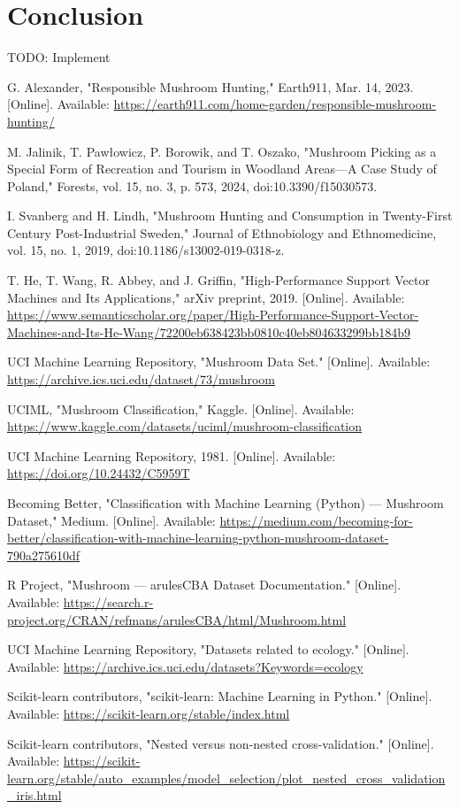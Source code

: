\documentclass[conference]{IEEEtran}
\begin{document}
\section{Conclusion}
TODO: Implement

\begin{thebibliography}{9}
 G. Alexander, "Responsible Mushroom Hunting," Earth911, Mar. 14, 2023. [Online]. Available: \url{https://earth911.com/home-garden/responsible-mushroom-hunting/}

 M. Jalinik, T. Paw\l{}owicz, P. Borowik, and T. Oszako, "Mushroom Picking as a Special Form of Recreation and Tourism in Woodland Areas—A Case Study of Poland," Forests, vol. 15, no. 3, p. 573, 2024, doi:10.3390/f15030573.

 I. Svanberg and H. Lindh, "Mushroom Hunting and Consumption in Twenty-First Century Post-Industrial Sweden," Journal of Ethnobiology and Ethnomedicine, vol. 15, no. 1, 2019, doi:10.1186/s13002-019-0318-z.

 T. He, T. Wang, R. Abbey, and J. Griffin, "High-Performance Support Vector Machines and Its Applications," arXiv preprint, 2019. [Online]. Available: \url{https://www.semanticscholar.org/paper/High-Performance-Support-Vector-Machines-and-Its-He-Wang/72200eb638423bb0810c40eb804633299bb184b9}

 UCI Machine Learning Repository, "Mushroom Data Set." [Online]. Available: \url{https://archive.ics.uci.edu/dataset/73/mushroom}

 UCIML, "Mushroom Classification," Kaggle. [Online]. Available: \url{https://www.kaggle.com/datasets/uciml/mushroom-classification}

 UCI Machine Learning Repository, 1981. [Online]. Available: \url{https://doi.org/10.24432/C5959T}

 Becoming Better, "Classification with Machine Learning (Python) — Mushroom Dataset," Medium. [Online]. Available: \url{https://medium.com/becoming-for-better/classification-with-machine-learning-python-mushroom-dataset-790a275610df}

 R Project, "Mushroom — arulesCBA Dataset Documentation." [Online]. Available: \url{https://search.r-project.org/CRAN/refmans/arulesCBA/html/Mushroom.html}

 UCI Machine Learning Repository, "Datasets related to ecology." [Online]. Available: \url{https://archive.ics.uci.edu/datasets?Keywords=ecology}

 Scikit-learn contributors, "scikit-learn: Machine Learning in Python." [Online]. Available: \url{https://scikit-learn.org/stable/index.html}

 Scikit-learn contributors, "Nested versus non-nested cross-validation." [Online]. Available: \url{https://scikit-learn.org/stable/auto_examples/model_selection/plot_nested_cross_validation_iris.html}
\end{thebibliography}
\end{document}
